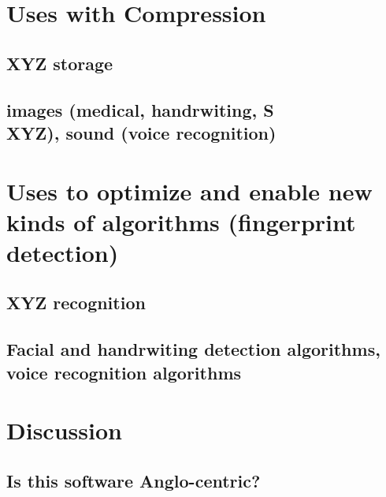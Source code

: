 \documentclass[12pt]{report}
\begin{document}
    \chapter{Uses with Compression}
    \section{XYZ storage}
    \blindtext[1]
    \section{images (medical, handrwiting, S\\XYZ), sound (voice recognition)}
    \blindtext[1]
    
    \chapter{Uses to optimize and enable new kinds of algorithms (fingerprint detection)}
    \section{XYZ recognition}
    \blindtext[1]
    \section{Facial and handrwiting detection algorithms, voice recognition algorithms}
    \blindtext[1]

    \chapter{Discussion}
    \section{Is this software Anglo-centric?}
    \blindtext[1]
    
    \pagebreak

    \chapter{}
\end{document}
